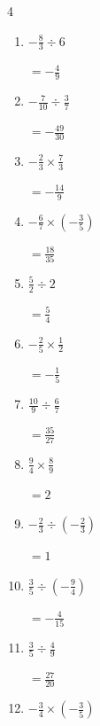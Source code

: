 \begin{multicols}{4}
\begin{enumerate}
        $\displaystyle =-\frac{5}{6}$

  \item $\displaystyle -\frac{8}{3}\div{}6$

        $\displaystyle =-\frac{4}{9}$

  \item $\displaystyle -\frac{7}{10}\div{}\frac{3}{7}$

        $\displaystyle =-\frac{49}{30}$

  \item $\displaystyle -\frac{2}{3}\times{}\frac{7}{3}$

        $\displaystyle =-\frac{14}{9}$

  \item $\displaystyle -\frac{6}{7}\times{}\left(-\frac{3}{5}\right)$

        $\displaystyle =\frac{18}{35}$

  \item $\displaystyle \frac{5}{2}\div{}2$

        $\displaystyle =\frac{5}{4}$

  \item $\displaystyle -\frac{2}{5}\times{}\frac{1}{2}$

        $\displaystyle =-\frac{1}{5}$

\columnbreak %

  \item $\displaystyle \frac{10}{9}\div{}\frac{6}{7}$

        $\displaystyle =\frac{35}{27}$

  \item $\displaystyle \frac{9}{4}\times{}\frac{8}{9}$

        $\displaystyle =2$

  \item $\displaystyle -\frac{2}{3}\div{}\left(-\frac{2}{3}\right)$

        $\displaystyle =1$

  \item $\displaystyle \frac{3}{5}\div{}\left(-\frac{9}{4}\right)$

        $\displaystyle =-\frac{4}{15}$

  \item $\displaystyle \frac{3}{5}\div{}\frac{4}{9}$

        $\displaystyle =\frac{27}{20}$

  \item $\displaystyle -\frac{3}{4}\times{}\left(-\frac{3}{5}\right)$


\end{enumerate}
\end{multicols}
